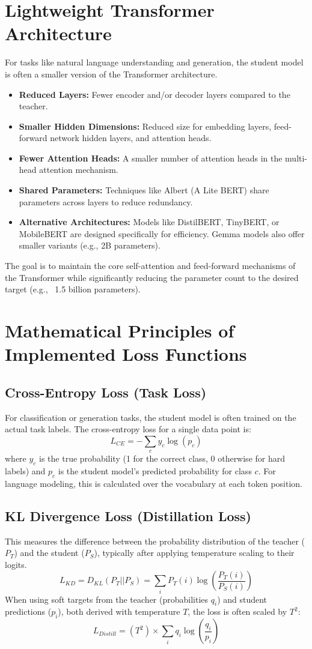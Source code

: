 \documentclass[12pt, a4paper]{report}
\begin{document}
\section{Lightweight Transformer Architecture}
\label{sec:lightweight_architecture}
For tasks like natural language understanding and generation, the student model is often a smaller version of the Transformer architecture.
\begin{itemize}
    \item \textbf{Reduced Layers:} Fewer encoder and/or decoder layers compared to the teacher.
    \item \textbf{Smaller Hidden Dimensions:} Reduced size for embedding layers, feed-forward network hidden layers, and attention heads.
    \item \textbf{Fewer Attention Heads:} A smaller number of attention heads in the multi-head attention mechanism.
    \item \textbf{Shared Parameters:} Techniques like Albert (A Lite BERT) share parameters across layers to reduce redundancy.
    \item \textbf{Alternative Architectures:} Models like DistilBERT, TinyBERT, or MobileBERT are designed specifically for efficiency. Gemma models also offer smaller variants (e.g., 2B parameters).
\end{itemize}
The goal is to maintain the core self-attention and feed-forward mechanisms of the Transformer while significantly reducing the parameter count to the desired target (e.g., ~1.5 billion parameters).

\section{Mathematical Principles of Implemented Loss Functions}
\label{sec:math_loss_functions}
\subsection{Cross-Entropy Loss (Task Loss)}
For classification or generation tasks, the student model is often trained on the actual task labels. The cross-entropy loss for a single data point is:
$$ L_{CE} = - \sum_c y_c \log(p_c) $$
where $y_c$ is the true probability (1 for the correct class, 0 otherwise for hard labels) and $p_c$ is the student model's predicted probability for class $c$. For language modeling, this is calculated over the vocabulary at each token position.

\subsection{KL Divergence Loss (Distillation Loss)}
This measures the difference between the probability distribution of the teacher ($P_T$) and the student ($P_S$), typically after applying temperature scaling to their logits.
$$ L_{KD} = D_{KL}(P_T || P_S) = \sum_i P_T(i) \log\left(\frac{P_T(i)}{P_S(i)}\right) $$
When using soft targets from the teacher (probabilities $q_i$) and student predictions ($p_i$), both derived with temperature $T$, the loss is often scaled by $T^2$:
$$ L_{Distill} = (T^2) \times \sum_i q_i \log\left(\frac{q_i}{p_i}\right) $$
\end{document}
